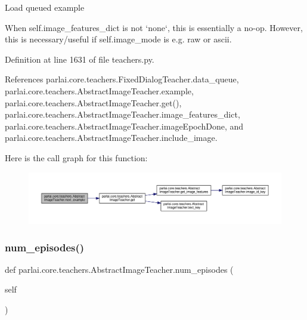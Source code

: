 \begin{DoxyVerb}Load queued example

When self.image_features_dict is not `none`, this is essentially a
no-op. However, this is necessary/useful if self.image_mode is e.g. raw
or ascii.
\end{DoxyVerb}
 

Definition at line 1631 of file teachers.\+py.



References parlai.\+core.\+teachers.\+Fixed\+Dialog\+Teacher.\+data\+\_\+queue, parlai.\+core.\+teachers.\+Abstract\+Image\+Teacher.\+example, parlai.\+core.\+teachers.\+Abstract\+Image\+Teacher.\+get(), parlai.\+core.\+teachers.\+Abstract\+Image\+Teacher.\+image\+\_\+features\+\_\+dict, parlai.\+core.\+teachers.\+Abstract\+Image\+Teacher.\+image\+Epoch\+Done, and parlai.\+core.\+teachers.\+Abstract\+Image\+Teacher.\+include\+\_\+image.

Here is the call graph for this function\+:
\nopagebreak
\begin{figure}[H]
\begin{center}
\leavevmode
\includegraphics[width=350pt]{classparlai_1_1core_1_1teachers_1_1AbstractImageTeacher_ae519608a207d86bd7801f3043ff0ebf5_cgraph}
\end{center}
\end{figure}
\mbox{\label{classparlai_1_1core_1_1teachers_1_1AbstractImageTeacher_a702999efa941a59854ee511fc99cd117}} 
\subsubsection{\texorpdfstring{num\+\_\+episodes()}{num\_episodes()}}
{\footnotesize\ttfamily def parlai.\+core.\+teachers.\+Abstract\+Image\+Teacher.\+num\+\_\+episodes (\begin{DoxyParamCaption}\item[{}]{self }\end{DoxyParamCaption})}



